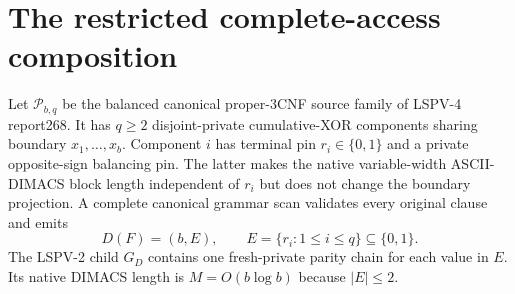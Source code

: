 \documentclass[11pt]{article}
\begin{document}
\section{The restricted complete-access composition}
Let $\mathcal P_{b,q}$ be the balanced canonical proper-3CNF source family of
LSPV-4 report268.  It has $q\ge2$ disjoint-private cumulative-XOR components
sharing boundary $x_1,\ldots,x_b$.  Component $i$ has terminal pin
$r_i\in\{0,1\}$ and a private opposite-sign balancing pin.  The latter makes
the native variable-width ASCII-DIMACS block length independent of $r_i$ but
does not change the boundary projection.  A complete canonical grammar scan
validates every original clause and emits
\[
 D(F)=(b,E),\qquad E=\{r_i:1\le i\le q\}\subseteq\{0,1\}.
\]
The LSPV-2 child $G_D$ contains one fresh-private parity chain for each value
in $E$.  Its native DIMACS length is $M=O(b\log b)$ because $|E|\le2$.
\end{document}
